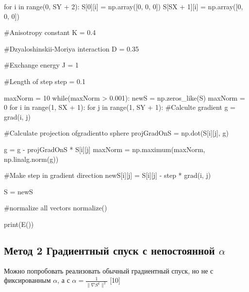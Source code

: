 \documentclass[ 12pt,x11names]{article}
\begin{document}
\begin{python}
    for i in range(0, SY + 2):
        S[0][i] = np.array([0, 0, 0])
        S[SX + 1][i] = np.array([0, 0, 0])

    #Anisotropy constant
    K = 0.4

    #Dzyaloshinskii-Moriya interaction
    D = 0.35

    #Exchange energy
    J = 1

    #Length of step
    step = 0.1

    maxNorm = 10
    while(maxNorm > 0.001):
        newS = np.zeros_like(S)
        maxNorm = 0
        for i in range(1, SX + 1):
            for j in range(1, SY + 1):
                #Calculte gradient
                g = grad(i,  j)

                #Calculate projection ofgradientto sphere
                projGradOnS = np.dot(S[i][j], g)

                g = g - projGradOnS * S[i][j]
                maxNorm = np.maximum(maxNorm, np.linalg.norm(g))

                #Make step in gradient direction
                newS[i][j] = S[i][j] - step * grad(i, j)

        S = newS

        #normalize all vectors
        normalize()

print(E())
\end{python}
 \subsection{Метод 2 Градиентный спуск с непостоянной $\alpha$}
 Можно попробовать реализовать обычный градиентный спуск, но не с фиксированным $\alpha$, а с $\alpha = \frac{1}{\| \nabla S^{k} \|^2}$ [10]\\
\end{document}
